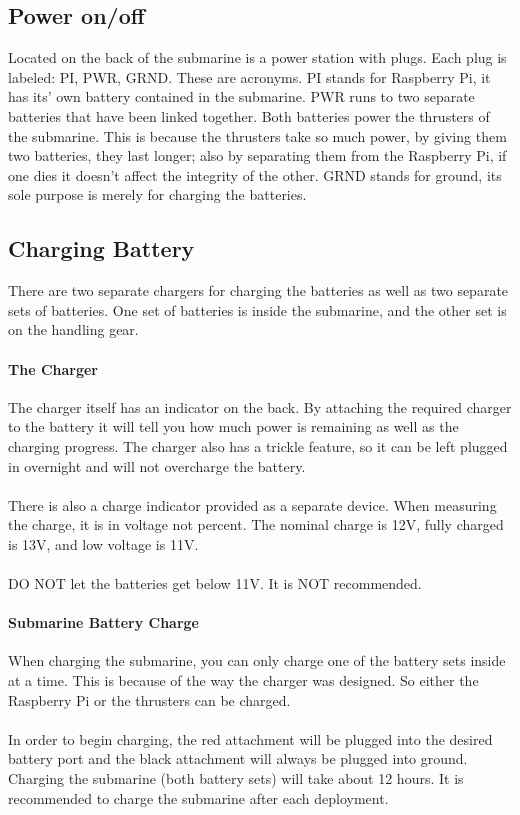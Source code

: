 \documentclass[
10pt, %
a4paper, %
oneside, %
headinclude,footinclude, %
BCOR5mm, %
]{scrartcl}
\begin{document}
\subsection{Power on/off}

Located on the back of the submarine is a power station with plugs. Each plug is labeled: PI, PWR, GRND. These are acronyms. PI stands for Raspberry Pi, it has its' own battery contained in the submarine. PWR runs to two separate batteries that have been linked together. Both batteries power the thrusters of the submarine. This is because the thrusters take so much power, by giving them two batteries, they last longer; also by separating them from the Raspberry Pi, if one dies it doesn't affect the integrity of the other. GRND stands for ground, its sole purpose is merely for charging the batteries.


\subsection{Charging Battery}

There are two separate chargers for charging the batteries as well as two separate sets of batteries. One set of batteries is inside the submarine, and the other set is on the handling gear.

\paragraph{The Charger}
The charger itself has an indicator on the back. By attaching the required charger to the battery it will tell you how much power is remaining as well as the charging progress. The charger also has a trickle feature, so it can be left plugged in overnight and will not overcharge the battery.\\ \\
There is also a charge indicator provided as a separate device. When measuring the charge, it is in voltage not percent. The nominal charge is 12V, fully charged is 13V, and low voltage is 11V. \\ \\
DO NOT let the batteries get below 11V. It is NOT recommended.

\paragraph{Submarine Battery Charge}
When charging the submarine, you can only charge one of the battery sets inside at a time. This is because of the way the charger was designed. So either the Raspberry Pi or the thrusters can be charged. \\ \\
In order to begin charging, the red attachment will be plugged into the desired battery port and the black attachment will always be plugged into ground. Charging the submarine (both battery sets) will take about 12 hours. It is recommended to charge the submarine after each deployment.
\end{document}
